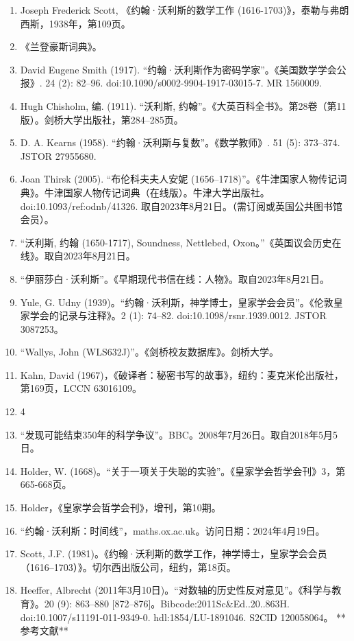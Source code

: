 \begin{enumerate}
\item Joseph Frederick Scott, 《约翰·沃利斯的数学工作 (1616-1703)》，泰勒与弗朗西斯，1938年，第109页。
\item 《兰登豪斯词典》。
\item  David Eugene Smith (1917). “约翰·沃利斯作为密码学家”。《美国数学学会公报》. 24 (2): 82–96. doi:10.1090/s0002-9904-1917-03015-7. MR 1560009.
\item Hugh Chisholm, 编. (1911). “沃利斯, 约翰”。《大英百科全书》。第28卷（第11版）。剑桥大学出版社，第284–285页。
\item D. A. Kearns (1958). “约翰·沃利斯与复数”。《数学教师》. 51 (5): 373–374. JSTOR 27955680.
\item Joan Thirsk (2005). “布伦科夫夫人安妮 (1656–1718)”。《牛津国家人物传记词典》。牛津国家人物传记词典（在线版）。牛津大学出版社。doi:10.1093/ref:odnb/41326. 取自2023年8月21日。（需订阅或英国公共图书馆会员）。
\item “沃利斯, 约翰 (1650-1717), Soundness, Nettlebed, Oxon。”《英国议会历史在线》。取自2023年8月21日。
\item “伊丽莎白·沃利斯”。《早期现代书信在线：人物》。取自2023年8月21日。
\item Yule, G. Udny (1939)。“约翰·沃利斯，神学博士，皇家学会会员”。《伦敦皇家学会的记录与注释》。2 (1): 74–82. doi:10.1098/rsnr.1939.0012. JSTOR 3087253。
\item “Wallys, John (WLS632J)”。《剑桥校友数据库》。剑桥大学。
\item Kahn, David (1967)，《破译者：秘密书写的故事》，纽约：麦克米伦出版社，第169页，LCCN 63016109。
\item 4
\item “发现可能结束350年的科学争议”。BBC。2008年7月26日。取自2018年5月5日。
\item Holder, W. (1668)。“关于一项关于失聪的实验”。《皇家学会哲学会刊》3，第665-668页。
\item Holder，《皇家学会哲学会刊》，增刊，第10期。
\item “约翰·沃利斯：时间线”，maths.ox.ac.uk。访问日期：2024年4月19日。
\item Scott, J.F. (1981)。《约翰·沃利斯的数学工作，神学博士，皇家学会会员（1616–1703）》。切尔西出版公司，纽约，第18页。
\item Heeffer, Albrecht (2011年3月10日)。“对数轴的历史性反对意见”。《科学与教育》。20 (9): 863–880 [872–876]。Bibcode:2011Sc&Ed..20..863H. doi:10.1007/s11191-011-9349-0. hdl:1854/LU-1891046. S2CID 120058064。
**参考文献**


\end{enumerate}
